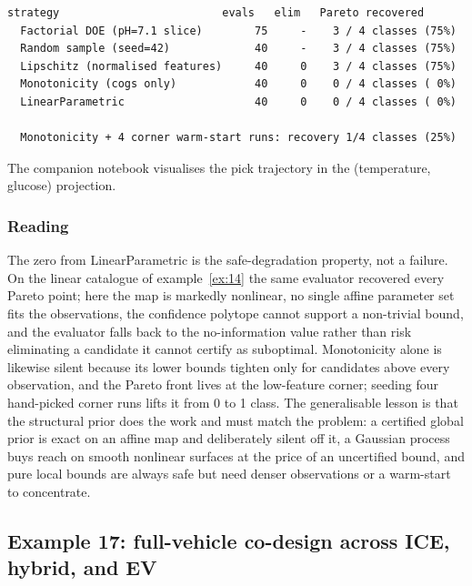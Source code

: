 \documentclass[11pt,a4paper]{article}
\begin{document}
\begin{lstlisting}[language={},numbers=none,keywordstyle={}]
  strategy                         evals   elim   Pareto recovered
  Factorial DOE (pH=7.1 slice)        75     -    3 / 4 classes (75%)
  Random sample (seed=42)             40     -    3 / 4 classes (75%)
  Lipschitz (normalised features)     40     0    3 / 4 classes (75%)
  Monotonicity (cogs only)            40     0    0 / 4 classes ( 0%)
  LinearParametric                    40     0    0 / 4 classes ( 0%)

  Monotonicity + 4 corner warm-start runs: recovery 1/4 classes (25%)
\end{lstlisting}

The companion notebook visualises the pick trajectory in the
(temperature, glucose) projection.

\subsubsection*{Reading}

The zero from LinearParametric is the safe-degradation property, not a
failure. On the linear catalogue of example~\ref{ex:14} the same
evaluator recovered every Pareto point; here the map is markedly
nonlinear, no single affine parameter set fits the observations, the
confidence polytope cannot support a non-trivial bound, and the
evaluator falls back to the no-information value rather than risk
eliminating a candidate it cannot certify as suboptimal. Monotonicity
alone is likewise silent because its lower bounds tighten only for
candidates above every observation, and the Pareto front lives at the
low-feature corner; seeding four hand-picked corner runs lifts it from
0 to 1 class. The generalisable lesson is that the structural prior
does the work and must match the problem: a certified global prior is
exact on an affine map and deliberately silent off it, a Gaussian
process buys reach on smooth nonlinear surfaces at the price of an
uncertified bound, and pure local bounds are always safe but need
denser observations or a warm-start to concentrate.

\subsection{Example 17: full-vehicle co-design across ICE, hybrid, and EV}
\label{ex:17}
\end{document}
